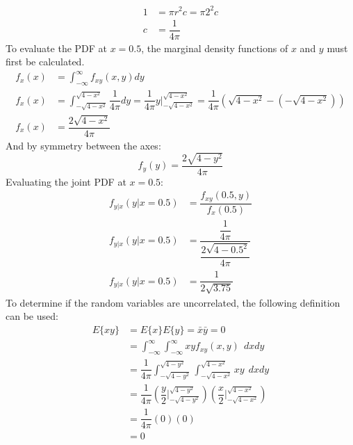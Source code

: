 \documentclass[11pt]{article}
\begin{document}
\begin{enumerate}[label=\textbf{\arabic*.}]
\begin{equation*}
\begin{split}
      1 &= \pi r^2 c = \pi 2^2 c \\
      c &= \dfrac{1}{4\pi}
    \end{split}
  \end{equation*}
  To evaluate the PDF at $x=0.5$, the marginal density functions of $x$ and $y$ 
  must first be calculated.
  \begin{equation*}
    \begin{split}
      f_x(x) &= \int_{-\infty}^{\infty} f_{xy}(x,y) dy \\
      f_x(x) &= \int_{-\sqrt{4-x^2}}^{\sqrt{4-x^2}} \dfrac{1}{4\pi} dy 
      = \dfrac{1}{4\pi} y \biggr|_{-\sqrt{4-x^2}}^{\sqrt{4-x^2}} 
      = \dfrac{1}{4\pi} (\sqrt{4-x^2} - (-\sqrt{4-x^2})) \\
      f_x(x) &= \dfrac{2\sqrt{4-x^2}}{4\pi}
    \end{split}
  \end{equation*}
  And by symmetry between the axes:
  \begin{equation*}
    f_y(y) = \dfrac{2\sqrt{4-y^2}}{4\pi}
  \end{equation*}
  Evaluating the joint PDF at $x=0.5$:
  \begin{equation*}
    \begin{split}
      f_{y|x}(y|x=0.5) &= \dfrac{f_{xy}(0.5,y)}{f_x(0.5)} \\
      f_{y|x}(y|x=0.5) &= \dfrac{\dfrac{1}{4\pi}}{\dfrac{2\sqrt{4-0.5^2}}{4\pi}} \\
      f_{y|x}(y|x=0.5) &= \dfrac{1}{2\sqrt{3.75}}
    \end{split}
  \end{equation*}
  To determine if the random variables are uncorrelated, the following 
  definition can be used:
  \begin{equation*}
    \begin{split}
      E\{xy\} &= E\{x\}E\{y\} = \bar{x}\bar{y} = 0 \\
      &= \int_{-\infty}^{\infty} \int_{-\infty}^{\infty} xy f_{xy}(x,y) \:\: dxdy \\
      &= \dfrac{1}{4\pi} \int_{-\sqrt{4-y^2}}^{\sqrt{4-y^2}} \int_{-\sqrt{4-x^2}}^{\sqrt{4-x^2}} xy \:\: dxdy \\
      &= \dfrac{1}{4\pi} \left(\dfrac{y}{2} \biggr|_{-\sqrt{4-y^2}}^{\sqrt{4-y^2}} \right) \left(\dfrac{x}{2} \biggr|_{-\sqrt{4-x^2}}^{\sqrt{4-x^2}}\right) \\
      &= \dfrac{1}{4\pi} (0)(0) \\
      &= 0
    \end{split}

\end{equation*}
\end{enumerate}
\end{document}
